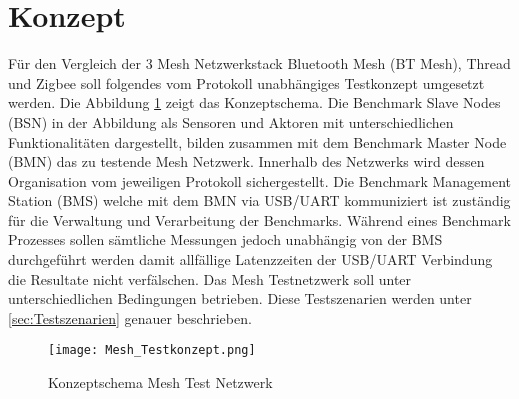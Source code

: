 	\clearpage
\section{Konzept}\label{sec:Konzept}

Für den Vergleich der 3 Mesh Netzwerkstack Bluetooth Mesh (BT Mesh), Thread und Zigbee soll folgendes vom Protokoll unabhängiges Testkonzept umgesetzt werden. 
Die Abbildung \ref{fig:MeshTestkonzept} zeigt das Konzeptschema. Die Benchmark Slave Nodes (BSN) in der Abbildung als Sensoren und Aktoren mit unterschiedlichen Funktionalitäten dargestellt, bilden zusammen mit dem Benchmark Master Node (BMN) das zu testende Mesh Netzwerk. Innerhalb des Netzwerks wird dessen Organisation vom jeweiligen Protokoll sichergestellt. 
Die Benchmark Management Station (BMS) welche mit dem BMN via USB/UART kommuniziert ist zuständig für die Verwaltung und Verarbeitung der Benchmarks. Während eines Benchmark Prozesses sollen sämtliche Messungen jedoch unabhängig von der BMS durchgeführt werden damit allfällige Latenzzeiten der USB/UART Verbindung die Resultate nicht verfälschen.
Das Mesh Testnetzwerk soll unter unterschiedlichen Bedingungen betrieben. Diese Testszenarien werden unter \ref{sec:Testszenarien} genauer beschrieben.






\begin{figure}[H]
	\centering
	\texttt{[image: Mesh\_Testkonzept.png]}
	\caption{Konzeptschema Mesh Test Netzwerk}\label{fig:MeshTestkonzept}
\end{figure}







